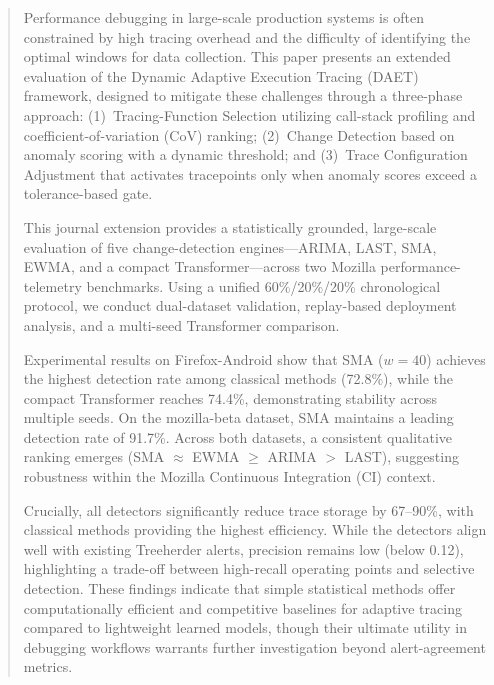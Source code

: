 \documentclass[a4paper,fleqn]{cas-sc}
\theoremstyle{plain}
\begin{document}
\begin{abstract}
Performance debugging in large-scale production systems is often constrained by high tracing overhead and the difficulty of identifying the optimal windows for data collection. This paper presents an extended evaluation of the Dynamic Adaptive Execution Tracing (DAET) framework, designed to mitigate these challenges through a three-phase approach: (1)~Tracing-Function Selection utilizing call-stack profiling and coefficient-of-variation (CoV) ranking; (2)~Change Detection based on anomaly scoring with a dynamic threshold; and (3)~Trace Configuration Adjustment that activates tracepoints only when anomaly scores exceed a tolerance-based gate. 

This journal extension provides a statistically grounded, large-scale evaluation of five change-detection engines—ARIMA, LAST, SMA, EWMA, and a compact Transformer—across two Mozilla performance-telemetry benchmarks. Using a unified 60\%/20\%/20\% chronological protocol, we conduct dual-dataset validation, replay-based deployment analysis, and a multi-seed Transformer comparison. 

Experimental results on Firefox-Android show that SMA ($w=40$) achieves the highest detection rate among classical methods (72.8\%), while the compact Transformer reaches 74.4\%, demonstrating stability across multiple seeds. On the mozilla-beta dataset, SMA maintains a leading detection rate of 91.7\%. Across both datasets, a consistent qualitative ranking emerges (SMA $\approx$ EWMA $\geq$ ARIMA $>$ LAST), suggesting robustness within the Mozilla Continuous Integration (CI) context. 

Crucially, all detectors significantly reduce trace storage by 67--90\%, with classical methods providing the highest efficiency. While the detectors align well with existing Treeherder alerts, precision remains low (below 0.12), highlighting a trade-off between high-recall operating points and selective detection. These findings indicate that simple statistical methods offer computationally efficient and competitive baselines for adaptive tracing compared to lightweight learned models, though their ultimate utility in debugging workflows warrants further investigation beyond alert-agreement metrics.
\end{abstract}
\end{document}
